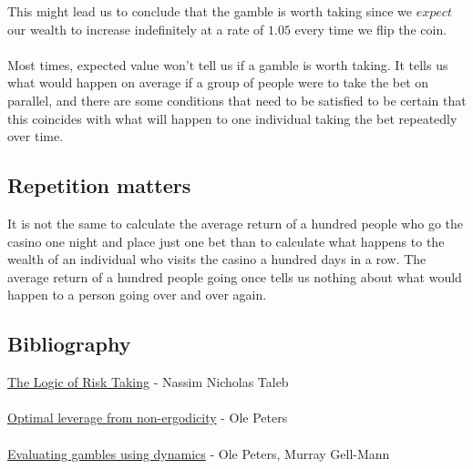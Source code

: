 \documentclass[12pt]{article}
\begin{document}
This might lead us to conclude that the gamble is worth taking since we $expect$ our wealth to increase indefinitely at a rate of $1.05$ every time we flip the coin.
\\\\
Most times, expected value won't tell us if a gamble is worth taking. It tells us what would happen on average if a group of people were to take the bet on parallel, and there are some conditions that need to be satisfied to be certain that this coincides with what will happen to one individual taking the bet repeatedly over time.

\subsection{Repetition matters}
It is not the same to calculate the average return of a hundred people who go the casino one night and place just one bet than to calculate what happens to the wealth of an individual who visits the casino a hundred days in a row. The average return of a hundred people going once tells us nothing about what would happen to a person going over and over again.

\subsection{Bibliography}
\href{https://medium.com/incerto/the-logic-of-risk-taking-107bf41029d3}{The Logic of Risk Taking} - Nassim Nicholas Taleb
\\\\
\href{https://arxiv.org/abs/0902.2965}{Optimal leverage from non-ergodicity} - Ole Peters
\\\\
\href{https://arxiv.org/abs/1405.0585}{Evaluating gambles using dynamics} - Ole Peters, Murray Gell-Mann
\end{document}
